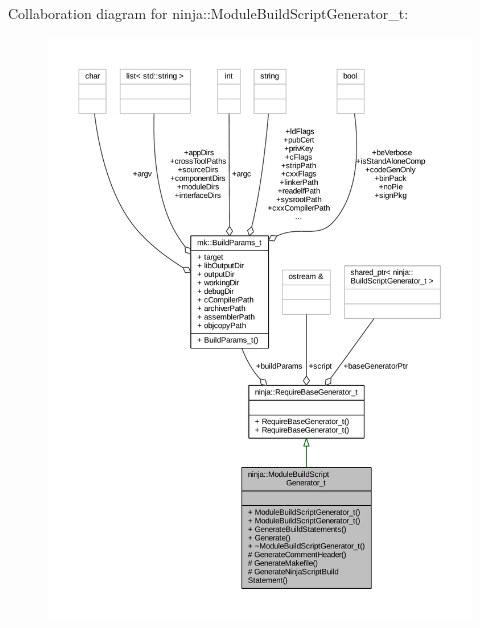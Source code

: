 Collaboration diagram for ninja\+:\+:Module\+Build\+Script\+Generator\+\_\+t\+:
\nopagebreak
\begin{figure}[H]
\begin{center}
\leavevmode
\includegraphics[width=350pt]{classninja_1_1_module_build_script_generator__t__coll__graph}
\end{center}
\end{figure}
